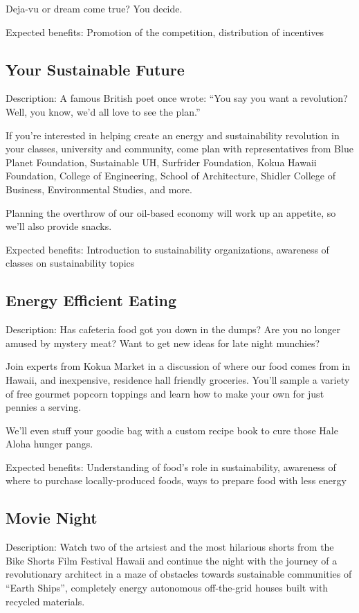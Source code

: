 Deja-vu or dream come true? You decide.

Expected benefits: Promotion of the competition, distribution of incentives


\subsection{Your Sustainable Future}

Description: A famous British poet once wrote: ``You say you want a revolution? Well, you know, we'd all love to see the plan.''

If you're interested in helping create an energy and sustainability revolution in your classes, university and community, come plan with representatives from Blue Planet Foundation, Sustainable UH, Surfrider Foundation, Kokua Hawaii Foundation, College of Engineering, School of Architecture, Shidler College of Business, Environmental Studies, and more.

Planning the overthrow of our oil-based economy will work up an appetite, so we'll also provide snacks.

Expected benefits: Introduction to sustainability organizations, awareness of classes on sustainability topics


\subsection{Energy Efficient Eating}

Description: Has cafeteria food got you down in the dumps? Are you no longer amused by mystery meat? Want to get new ideas for late night munchies?

Join experts from Kokua Market in a discussion of where our food comes from in Hawaii, and inexpensive, residence hall friendly groceries. You'll sample a variety of free gourmet popcorn toppings and learn how to make your own for just pennies a serving.

We'll even stuff your goodie bag with a custom recipe book to cure those Hale Aloha hunger pangs.

Expected benefits: Understanding of food's role in sustainability, awareness of where to purchase locally-produced foods, ways to prepare food with less energy


\subsection{Movie Night}

Description: Watch two of the artsiest and the most hilarious shorts from the Bike Shorts Film Festival Hawaii and continue the night with the journey of a revolutionary architect in a maze of obstacles towards sustainable communities of ``Earth Ships'', completely energy autonomous off-the-grid houses built with recycled materials.

